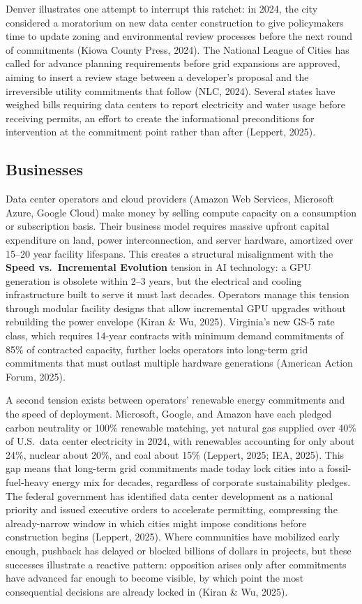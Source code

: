 \documentclass[10pt, twocolumn]{article}
\begin{document}
Denver illustrates one attempt to interrupt this ratchet: in 2024, the city considered a moratorium on new data center construction to give policymakers time to update zoning and environmental review processes before the next round of commitments (Kiowa County Press, 2024). The National League of Cities has called for advance planning requirements before grid expansions are approved, aiming to insert a review stage between a developer's proposal and the irreversible utility commitments that follow (NLC, 2024). Several states have weighed bills requiring data centers to report electricity and water usage before receiving permits, an effort to create the informational preconditions for intervention at the commitment point rather than after (Leppert, 2025).

\subsection*{Businesses}

Data center operators and cloud providers (Amazon Web Services, Microsoft Azure, Google Cloud) make money by selling compute capacity on a consumption or subscription basis. Their business model requires massive upfront capital expenditure on land, power interconnection, and server hardware, amortized over 15--20 year facility lifespans. This creates a structural misalignment with the \textbf{Speed vs.\ Incremental Evolution} tension in AI technology: a GPU generation is obsolete within 2--3 years, but the electrical and cooling infrastructure built to serve it must last decades. Operators manage this tension through modular facility designs that allow incremental GPU upgrades without rebuilding the power envelope (Kiran \& Wu, 2025). Virginia's new GS-5 rate class, which requires 14-year contracts with minimum demand commitments of 85\% of contracted capacity, further locks operators into long-term grid commitments that must outlast multiple hardware generations (American Action Forum, 2025).

A second tension exists between operators' renewable energy commitments and the speed of deployment. Microsoft, Google, and Amazon have each pledged carbon neutrality or 100\% renewable matching, yet natural gas supplied over 40\% of U.S.\ data center electricity in 2024, with renewables accounting for only about 24\%, nuclear about 20\%, and coal about 15\% (Leppert, 2025; IEA, 2025). This gap means that long-term grid commitments made today lock cities into a fossil-fuel-heavy energy mix for decades, regardless of corporate sustainability pledges. The federal government has identified data center development as a national priority and issued executive orders to accelerate permitting, compressing the already-narrow window in which cities might impose conditions before construction begins (Leppert, 2025). Where communities have mobilized early enough, pushback has delayed or blocked billions of dollars in projects, but these successes illustrate a reactive pattern: opposition arises only after commitments have advanced far enough to become visible, by which point the most consequential decisions are already locked in (Kiran \& Wu, 2025).
\end{document}
